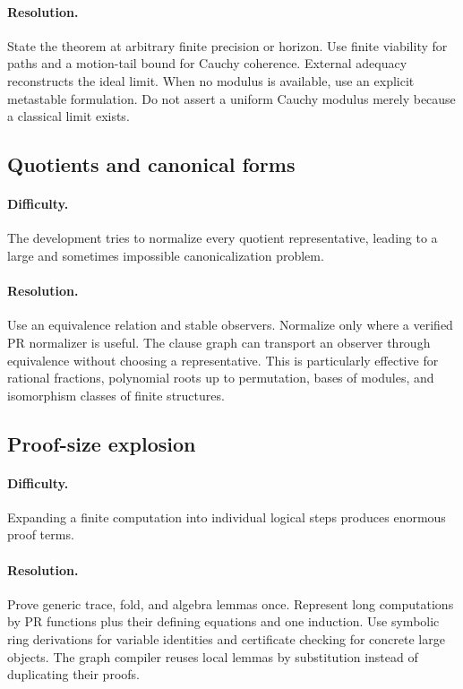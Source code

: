 \paragraph{Resolution.}
State the theorem at arbitrary finite precision or horizon.  Use finite
viability for paths and a motion-tail bound for Cauchy coherence.  External
adequacy reconstructs the ideal limit.  When no modulus is available, use an
explicit metastable formulation.  Do not assert a uniform Cauchy modulus merely
because a classical limit exists.

\subsection{Quotients and canonical forms}

\paragraph{Difficulty.}
The development tries to normalize every quotient representative, leading to a
large and sometimes impossible canonicalization problem.

\paragraph{Resolution.}
Use an equivalence relation and stable observers.  Normalize only where a
verified PR normalizer is useful.  The clause graph can transport an observer
through equivalence without choosing a representative.  This is particularly
effective for rational fractions, polynomial roots up to permutation, bases of
modules, and isomorphism classes of finite structures.

\subsection{Proof-size explosion}

\paragraph{Difficulty.}
Expanding a finite computation into individual logical steps produces enormous
proof terms.

\paragraph{Resolution.}
Prove generic trace, fold, and algebra lemmas once.  Represent long computations
by PR functions plus their defining equations and one induction.  Use symbolic
ring derivations for variable identities and certificate checking for concrete
large objects.  The graph compiler reuses local lemmas by substitution instead
of duplicating their proofs.

